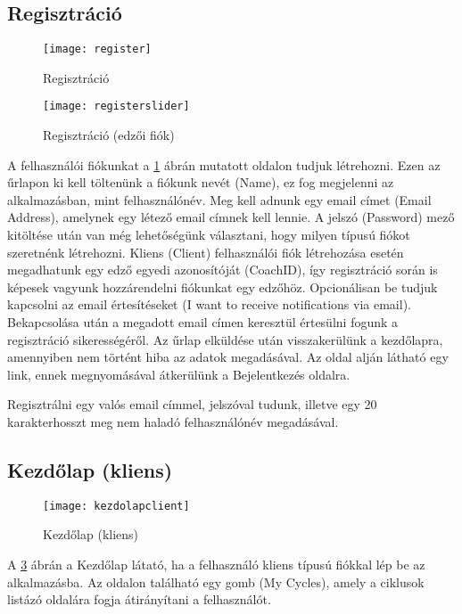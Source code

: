 \subsection{Regisztráció}

\begin{figure}[H]
	\centering
	\texttt{[image: register]}
	\caption{Regisztráció}
	\label{fig:register}
\end{figure}

\begin{figure}[H]
	\centering
	\texttt{[image: registerslider]}
	\caption{Regisztráció (edzői fiók)}
	\label{fig:registerslider}
\end{figure}

A felhasználói fiókunkat a \ref{fig:register} ábrán mutatott oldalon tudjuk létrehozni. Ezen az űrlapon ki kell töltenünk a fiókunk nevét (Name), ez fog megjelenni az alkalmazásban, mint felhasználónév. Meg kell adnunk egy email címet (Email Address), amelynek egy létező email címnek kell lennie. A jelszó (Password) mező kitöltése után van még lehetőségünk választani, hogy milyen típusú fiókot szeretnénk létrehozni. Kliens (Client) felhasználói fiók létrehozása esetén megadhatunk egy edző egyedi azonosítóját (CoachID), így regisztráció során is képesek vagyunk hozzárendelni fiókunkat egy edzőhöz. Opcionálisan be tudjuk kapcsolni az email értesítéseket (I want to receive notifications via email). Bekapcsolása után a megadott email címen keresztül értesülni fogunk a regisztráció sikerességéről. Az űrlap elküldése után visszakerülünk a kezdőlapra, amennyiben nem történt hiba az adatok megadásával. Az oldal alján látható egy link, ennek megnyomásával átkerülünk a Bejelentkezés oldalra.

\bigskip

Regisztrálni egy valós email címmel, jelszóval tudunk, illetve egy 20 karakterhosszt meg nem haladó felhasználónév megadásával.

\subsection{Kezdőlap (kliens)}

\begin{figure}[H]
	\centering
	\texttt{[image: kezdolapclient]}
	\caption{Kezdőlap (kliens)}
	\label{fig:kezdolapclient}
\end{figure}

A \ref{fig:kezdolapclient} ábrán a Kezdőlap látató, ha a felhasználó kliens típusú fiókkal lép be az alkalmazásba. Az oldalon található egy gomb (My Cycles), amely a ciklusok listázó oldalára fogja átirányítani a felhasználót.

